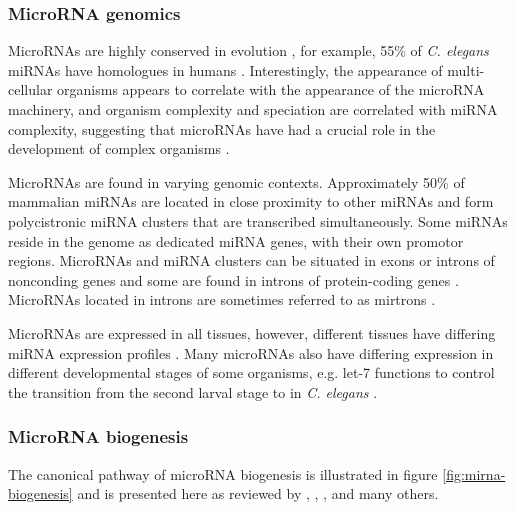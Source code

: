 \subsubsection{MicroRNA genomics}\label{microrna-genomics}

MicroRNAs are highly conserved in evolution \citep{Bartel2004}, for example,
55\% of \emph{C. elegans} miRNAs have homologues in humans
\citep{IbanezVentoso2008}. Interestingly, the
appearance of multi-cellular organisms appears to correlate with the
appearance of the microRNA machinery, and organism complexity and speciation
are correlated with miRNA complexity, suggesting that microRNAs have had a
crucial role in the development of complex organisms \citep{Lee2007}.

MicroRNAs are found in varying genomic contexts. Approximately 50\% of
mammalian miRNAs are located in close proximity to other miRNAs and form
polycistronic miRNA clusters that are transcribed simultaneously. Some miRNAs
reside in the genome as dedicated miRNA genes, with their own promotor regions.
\citep{Kim2009} MicroRNAs and miRNA clusters can be situated in exons or
introns of nonconding genes and some are found in introns of protein-coding genes
\citep{Du2005}. MicroRNAs located in introns are sometimes referred to as
mirtrons \citep{Ruby2007}.

MicroRNAs are expressed in all tissues, however, different tissues
have differing miRNA expression profiles \citep{Krol2010}. Many microRNAs also
have differing expression in different developmental stages
of some organisms, e.g. let-7 functions to control the transition
from the second larval stage to in \emph{C. elegans} \citep{Bartel2004}.







\subsubsection{MicroRNA biogenesis}\label{microrna-biogenesis}

The canonical pathway of microRNA biogenesis is illustrated in figure
\ref{fig:mirna-biogenesis} and is presented here as reviewed by \citet{Bartel2004},
\citet{Melo2011}, \citet{Ha2014}, and many others. 

